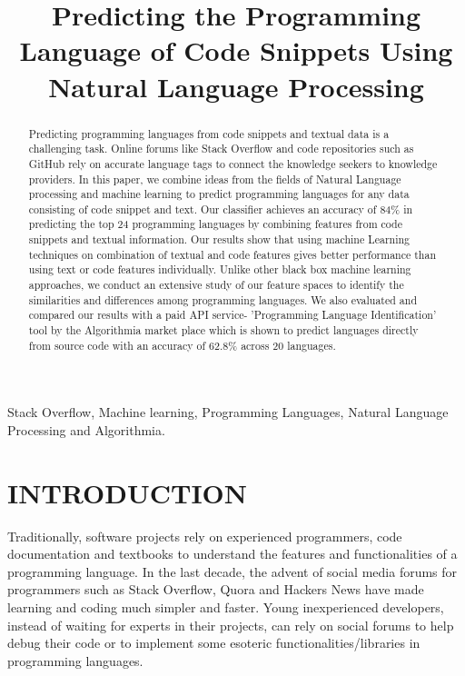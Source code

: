 \documentclass[letterpaper, 10 pt, conference]{ieeeconf}  %
\title{\LARGE \bf
Predicting the Programming Language of Code Snippets Using Natural Language Processing
}
\begin{document}
\maketitle
\thispagestyle{empty}
\pagestyle{empty}
\begin{abstract} %
 
Predicting programming languages from code snippets and textual data is a challenging task. Online forums like Stack Overflow and code repositories such as GitHub rely on accurate language tags to connect the knowledge seekers to knowledge providers. In this paper, we combine ideas from the fields of Natural Language processing and machine learning to predict programming languages for any data consisting of code snippet and text. Our classifier achieves an accuracy of 84\% in predicting the top 24 programming languages by combining features from code snippets and textual information. Our results show that using machine Learning techniques on combination of textual and code features gives better performance than using text or code features individually. Unlike other black box machine learning approaches, we conduct an extensive study of our feature spaces to identify the similarities and differences among programming languages. We also evaluated and compared our results with a paid API service- 'Programming Language Identification' tool by the Algorithmia market place which is shown to predict languages directly from source code with an accuracy of 62.8\% across 20 languages.

\bigbreak

 
\end{abstract}

\begin{keywords}
Stack Overflow, Machine learning, Programming Languages, Natural Language Processing and Algorithmia.
\end{keywords}
 
\section{INTRODUCTION}
 
Traditionally, software projects rely on experienced programmers, code documentation and textbooks to understand the features and functionalities of a programming language. In the last decade, the advent of social media forums for programmers such as Stack Overflow, Quora and Hackers News have made learning and coding much simpler and faster. Young inexperienced developers, instead of waiting for experts in their projects, can rely on social forums to help debug their code or to implement some esoteric functionalities/libraries in programming languages. 
 
\end{document}
